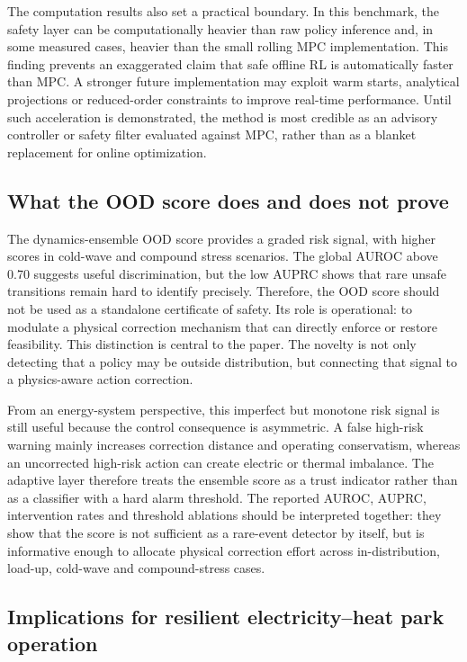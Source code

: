 \documentclass[preprint,12pt]{elsarticle}
\begin{document}
The computation results also set a practical boundary. In this benchmark, the safety layer can be computationally heavier than raw policy inference and, in some measured cases, heavier than the small rolling MPC implementation. This finding prevents an exaggerated claim that safe offline RL is automatically faster than MPC. A stronger future implementation may exploit warm starts, analytical projections or reduced-order constraints to improve real-time performance. Until such acceleration is demonstrated, the method is most credible as an advisory controller or safety filter evaluated against MPC, rather than as a blanket replacement for online optimization.

\subsection{What the OOD score does and does not prove}

The dynamics-ensemble OOD score provides a graded risk signal, with higher scores in cold-wave and compound stress scenarios. The global AUROC above 0.70 suggests useful discrimination, but the low AUPRC shows that rare unsafe transitions remain hard to identify precisely. Therefore, the OOD score should not be used as a standalone certificate of safety. Its role is operational: to modulate a physical correction mechanism that can directly enforce or restore feasibility. This distinction is central to the paper. The novelty is not only detecting that a policy may be outside distribution, but connecting that signal to a physics-aware action correction.

From an energy-system perspective, this imperfect but monotone risk signal is still useful because the control consequence is asymmetric. A false high-risk warning mainly increases correction distance and operating conservatism, whereas an uncorrected high-risk action can create electric or thermal imbalance. The adaptive layer therefore treats the ensemble score as a trust indicator rather than as a classifier with a hard alarm threshold. The reported AUROC, AUPRC, intervention rates and threshold ablations should be interpreted together: they show that the score is not sufficient as a rare-event detector by itself, but is informative enough to allocate physical correction effort across in-distribution, load-up, cold-wave and compound-stress cases.

\subsection{Implications for resilient electricity--heat park operation}
\end{document}
